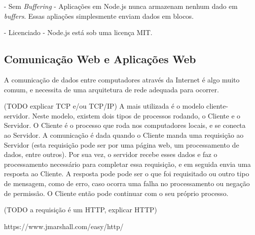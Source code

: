 \documentclass[a4paper,12pt]{article}
\begin{document}
- Sem \emph{Buffering} - Aplicações em Node.js nunca armazenam nenhum dado em \emph{buffers}. Essas apliações simplesmente enviam dados em blocos.

- Licenciado - Node.js está sob uma licença MIT.







\subsection{Comunicação Web e Aplicações Web}

A comunicação de dados entre computadores através da Internet é algo muito comum, e necessita de uma arquitetura de rede adequada para ocorrer.

(TODO explicar TCP e/ou TCP/IP)
A mais utilizada é o modelo cliente-servidor. Neste modelo, existem dois tipos de processos rodando, o Cliente e o Servidor. O Cliente é o processo que roda nos computadores locais, e se conecta ao Servidor. A comunicação é dada quando o Cliente manda uma requisição ao Servidor (esta requisição pode ser por uma página web, um processamento de dados, entre outros). Por sua vez, o servidor recebe esses dados e faz o processamento necessário para completar essa requisição, e em seguida envia uma resposta ao Cliente. A resposta pode pode ser o que foi requisitado ou outro tipo de mensagem, como de erro, caso ocorra uma falha no processamento ou negação de permissão. O Cliente então pode continuar com o seu próprio processo.


(TODO a requisição é um HTTP, explicar HTTP)

https://www.jmarshall.com/easy/http/
\end{document}
